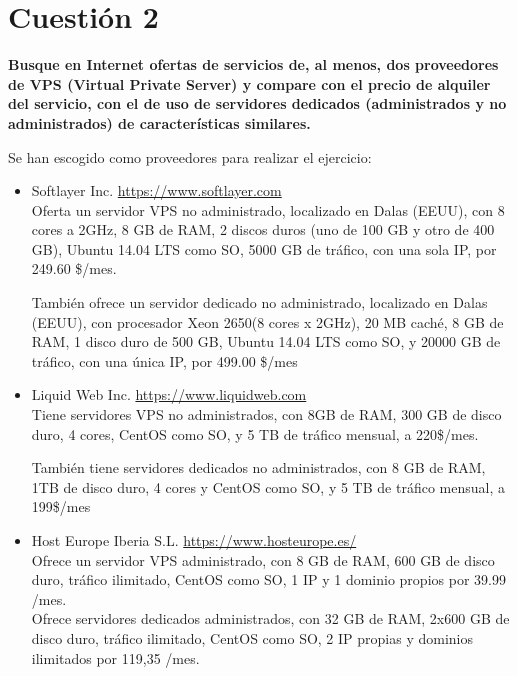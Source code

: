 \documentclass[a4paper,11pt]{article}
\newenvironment{answer}{%
\begin{list}{}{%
}%
\item[]}{\end{list}}
\begin{document}
\section{Cuestión 2}
\textbf{Busque en Internet ofertas de servicios de, al menos, dos proveedores de
VPS (Virtual Private Server) y compare con el precio de alquiler del servicio, con el de
uso de servidores dedicados (administrados y no administrados) de características
similares.}
\begin{answer}
 Se han escogido como proveedores para realizar el ejercicio:
 \begin{itemize}
  \item Softlayer Inc.  \url{https://www.softlayer.com}\\
   Oferta un servidor VPS no administrado, localizado en Dalas (EEUU), con 8 cores a 2GHz, 8 GB de RAM, 2 discos duros (uno de 
   100 GB y otro de 400 GB), Ubuntu 14.04 LTS como SO, 5000 GB de tráfico, con una sola IP, por 249.60 \$/mes.
  
   También ofrece un servidor dedicado no administrado, localizado en Dalas (EEUU), con procesador Xeon 2650(8 cores x 2GHz), 20 MB caché,
   8 GB de RAM, 1 disco duro de 500 GB, Ubuntu 14.04 LTS como SO, y 20000 GB de tráfico, con una única IP, por 499.00 \$/mes
  \item Liquid Web Inc. \url{https://www.liquidweb.com}\\
   Tiene servidores VPS no administrados, con 8GB de RAM, 300 GB de disco duro, 4 cores, CentOS como SO, y 5 TB de tráfico mensual, a 220\$/mes.
   
   También tiene servidores dedicados no administrados, con 8 GB de RAM, 1TB de disco duro, 4 cores y CentOS como SO, y 5 TB de tráfico mensual, a 199\$/mes
  \item Host Europe Iberia S.L. \url{https://www.hosteurope.es/}\\
   Ofrece un servidor VPS administrado, con 8 GB de RAM, 600 GB de disco duro, tráfico ilimitado, CentOS como SO,
   1 IP y 1 dominio propios por 39.99 /mes.\\
   Ofrece servidores dedicados administrados, con 32 GB de RAM, 2x600 GB de disco duro, tráfico ilimitado, CentOS como
   SO, 2 IP propias y dominios ilimitados por 119,35 /mes.
 \end{itemize}
\end{answer}
\end{document}
